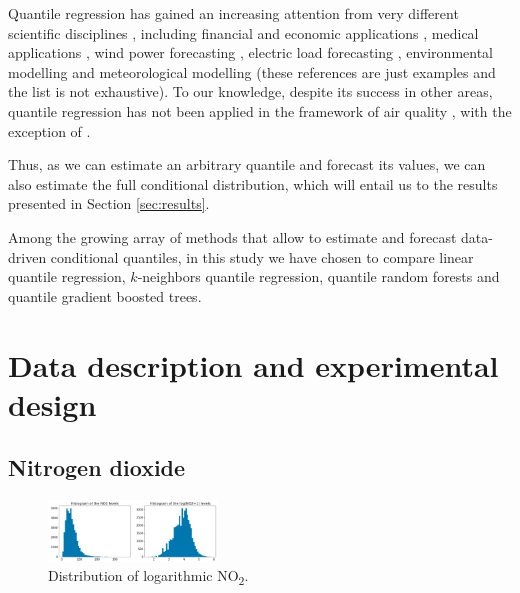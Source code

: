 \documentclass[a4paper,twocolumn,5p]{elsarticle}
\begin{document}
Quantile regression has gained an increasing attention from very
different scientific disciplines \cite{yu_quantile_2003}, including
financial and economic applications \cite{ben_rejeb_financial_2016},
medical applications \cite{jang_quantile_2018}, wind power
forecasting \cite{wan_direct_2017}, electric load forecasting
\cite{lebotsa_short_2018}, environmental modelling
\cite{cade_gentle_2003} and meteorological modelling
\cite{baur_modelling_2004} (these references are just
examples and the list is not exhaustive). To our knowledge, despite
its success in other areas, quantile regression has not been applied
in the framework of air quality , with the exception of
 \cite{martinezsilva_forecasting_2016}.

Thus, as we can estimate an arbitrary quantile and forecast its
values, we can also estimate the full conditional distribution, which
will entail us to the results presented in Section \ref{sec:results}.

Among the growing array of methods that allow to estimate and forecast
data-driven conditional quantiles, in this study we have chosen to
compare linear quantile regression, $k$-neighbors quantile regression,
quantile random forests and quantile gradient boosted trees.


\section{Data description and experimental design}

\subsection{Nitrogen dioxide}
\label{sec:no2}


\begin{figure}
  \centering
  \includegraphics[width=0.4\textwidth]{histo_no2}
  \caption{\label{figure:histo_no2}Distribution of logarithmic
    NO\textsubscript{2}.}
\end{figure}
\end{document}
